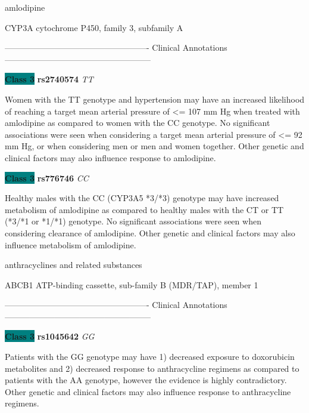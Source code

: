 \documentclass{resume} %
\begin{document}
\begin{rSection}{ amlodipine }
\begin{rSubsection}{ CYP3A }{ cytochrome P450, family 3, subfamily A }{}{}
\item[] ---------------------------------------------------- Clinical Annotations -----------------------------------------------------\newline
\item \textbf{\colorbox{teal} {Class 3}} \textbf{ rs2740574 } \textit{ TT }
\item[] Women with the TT genotype and hypertension may have an increased likelihood of reaching a target mean arterial pressure of <= 107 mm Hg when treated with amlodipine as compared to women with the CC genotype. No significant associations were seen when considering a target mean arterial pressure of <= 92 mm Hg, or when considering men or men and women together. Other genetic and clinical factors may also influence response to amlodipine.\item \textbf{\colorbox{teal} {Class 3}} \textbf{ rs776746 } \textit{ CC }
\item[] Healthy males with the CC (CYP3A5 *3/*3) genotype may have increased metabolism of amlodipine as compared to healthy males with the CT or TT (*3/*1 or *1/*1) genotype. No significant associations were seen when considering clearance of amlodipine. Other genetic and clinical factors may also influence metabolism of amlodipine.
\end{rSubsection}

\end{rSection}\begin{rSection}{ anthracyclines and related substances }
\item[]

\begin{rSubsection}{ ABCB1 }{ ATP-binding cassette, sub-family B (MDR/TAP), member 1 }{}{}
\item[]

\item[] ---------------------------------------------------- Clinical Annotations -----------------------------------------------------\newline
\item \textbf{\colorbox{teal} {Class 3}} \textbf{ rs1045642 } \textit{ GG }
\item[] Patients with the GG genotype may have 1) decreased exposure to doxorubicin metabolites and 2) decreased response to anthracycline regimens as compared to patients with the AA genotype, however the evidence is highly contradictory. Other genetic and clinical factors may also influence response to anthracycline regimens.
\end{rSubsection}


\end{rSection}
\end{document}
